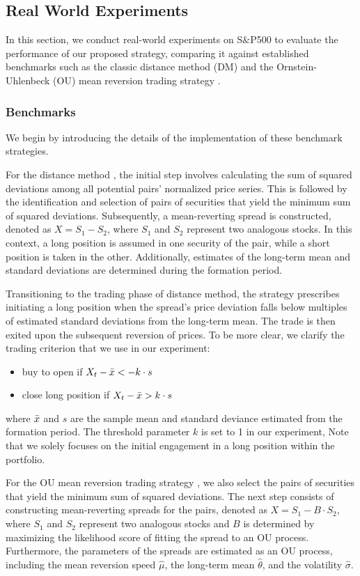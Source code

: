 \documentclass{article}
\begin{document}
\subsection{Real World Experiments}
In this section, we conduct real-world experiments on S$\&$P500 to evaluate the performance of our proposed strategy, comparing it against established benchmarks such as the classic distance method (DM) \cite{gatev2006pairs} and the Ornstein-Uhlenbeck (OU) mean reversion trading strategy \cite{avellaneda2010statistical, meanReversionBook}. 

\subsubsection{Benchmarks}
We begin by introducing the details of the implementation of these benchmark strategies.

For the distance method \cite{gatev2006pairs}, the initial step involves calculating the sum of squared deviations among all potential pairs' normalized price series. This is followed by the identification and selection of pairs of securities that yield the minimum sum of squared deviations. Subsequently, a mean-reverting spread is constructed, denoted as \(X = S_1 - S_2\), where \(S_1\) and \(S_2\) represent two analogous stocks. In this context, a long position is assumed in one security of the pair, while a short position is taken in the other. Additionally, estimates of the long-term mean and standard deviations are determined during the formation period. 

Transitioning to the trading phase of distance method, the strategy prescribes initiating a long position when the spread's price deviation falls below multiples of estimated standard deviations from the long-term mean. The trade is then exited upon the subsequent reversion of prices. To be more clear, we clarify the trading criterion that we use in our experiment:
\begin{itemize}
    \item buy to open if \(X_t - \Bar{x} < -k\cdot s\)
    \item close long position if \(X_t - \Bar{x} > k\cdot s\)
\end{itemize}
where $\Bar{x}$ and $s$ are the sample mean and standard deviance estimated from the formation period. The threshold parameter \(k\) is set to 1 in our experiment, 
 Note that we solely focuses on the initial engagement in a long position within the portfolio.

For the OU mean reversion trading strategy \cite{avellaneda2010statistical, meanReversionBook}, we also select the
pairs of securities that yield the minimum sum of squared deviations. The next step consists of constructing mean-reverting spreads for the pairs, denoted as \(X = S_1 - B\cdot S_2\), where \(S_1\) and \(S_2\) represent two analogous stocks and \(B\) is determined by maximizing the likelihood score of fitting the spread to an OU process. Furthermore, the parameters of the spreads are estimated as an OU process, including the mean reversion speed \(\hat{\mu}\), the long-term mean \(\hat{\theta}\), and the volatility \(\hat{\sigma}\). 
\end{document}
